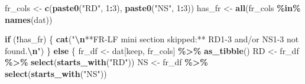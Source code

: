 \documentclass[
  10pt,
]{article}
\newenvironment{Shaded}{\begin{snugshade}}{\end{snugshade}}
\newcommand{\ControlFlowTok}[1]{\textcolor[rgb]{0.13,0.29,0.53}{\textbf{#1}}}
\newcommand{\DecValTok}[1]{\textcolor[rgb]{0.00,0.00,0.81}{#1}}
\newcommand{\FunctionTok}[1]{\textcolor[rgb]{0.13,0.29,0.53}{\textbf{#1}}}
\newcommand{\NormalTok}[1]{#1}
\newcommand{\OtherTok}[1]{\textcolor[rgb]{0.56,0.35,0.01}{#1}}
\newcommand{\SpecialCharTok}[1]{\textcolor[rgb]{0.81,0.36,0.00}{\textbf{#1}}}
\newcommand{\StringTok}[1]{\textcolor[rgb]{0.31,0.60,0.02}{#1}}
\begin{document}
\begin{Shaded}
\begin{Highlighting}[]
\NormalTok{fr\_cols }\OtherTok{\textless{}{-}} \FunctionTok{c}\NormalTok{(}\FunctionTok{paste0}\NormalTok{(}\StringTok{"RD"}\NormalTok{, }\DecValTok{1}\SpecialCharTok{:}\DecValTok{3}\NormalTok{), }\FunctionTok{paste0}\NormalTok{(}\StringTok{"NS"}\NormalTok{, }\DecValTok{1}\SpecialCharTok{:}\DecValTok{3}\NormalTok{))}
\NormalTok{has\_fr  }\OtherTok{\textless{}{-}} \FunctionTok{all}\NormalTok{(fr\_cols }\SpecialCharTok{\%in\%} \FunctionTok{names}\NormalTok{(dat))}

\ControlFlowTok{if}\NormalTok{ (}\SpecialCharTok{!}\NormalTok{has\_fr) \{}
  \FunctionTok{cat}\NormalTok{(}\StringTok{"}\SpecialCharTok{\textbackslash{}n}\StringTok{**FR{-}LF mini section skipped:** RD1{-}3 and/or NS1{-}3 not found.}\SpecialCharTok{\textbackslash{}n}\StringTok{"}\NormalTok{)}
\NormalTok{\} }\ControlFlowTok{else}\NormalTok{ \{}
\NormalTok{  fr\_df }\OtherTok{\textless{}{-}}\NormalTok{ dat[keep, fr\_cols] }\SpecialCharTok{\%\textgreater{}\%} \FunctionTok{as\_tibble}\NormalTok{()}
\NormalTok{  RD }\OtherTok{\textless{}{-}}\NormalTok{ fr\_df }\SpecialCharTok{\%\textgreater{}\%} \FunctionTok{select}\NormalTok{(}\FunctionTok{starts\_with}\NormalTok{(}\StringTok{"RD"}\NormalTok{))}
\NormalTok{  NS }\OtherTok{\textless{}{-}}\NormalTok{ fr\_df }\SpecialCharTok{\%\textgreater{}\%} \FunctionTok{select}\NormalTok{(}\FunctionTok{starts\_with}\NormalTok{(}\StringTok{"NS"}\NormalTok{))}


\end{Highlighting}
\end{Shaded}
\end{document}
